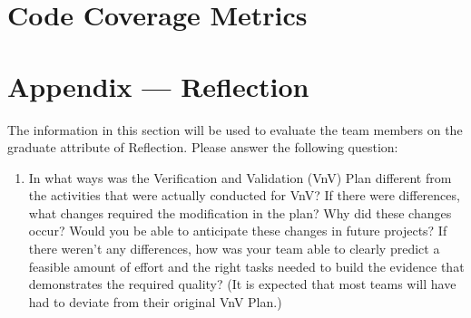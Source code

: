 \documentclass[12pt, titlepage]{article}
\begin{document}
\section{Code Coverage Metrics}




\newpage{}
\section*{Appendix --- Reflection}

The information in this section will be used to evaluate the team members on the
graduate attribute of Reflection.  Please answer the following question:

\begin{enumerate}
  \item In what ways was the Verification and Validation (VnV) Plan different
  from the activities that were actually conducted for VnV?  If there were
  differences, what changes required the modification in the plan?  Why did
  these changes occur?  Would you be able to anticipate these changes in future
  projects?  If there weren't any differences, how was your team able to clearly
  predict a feasible amount of effort and the right tasks needed to build the
  evidence that demonstrates the required quality?  (It is expected that most
  teams will have had to deviate from their original VnV Plan.)
\end{enumerate}
\end{document}
